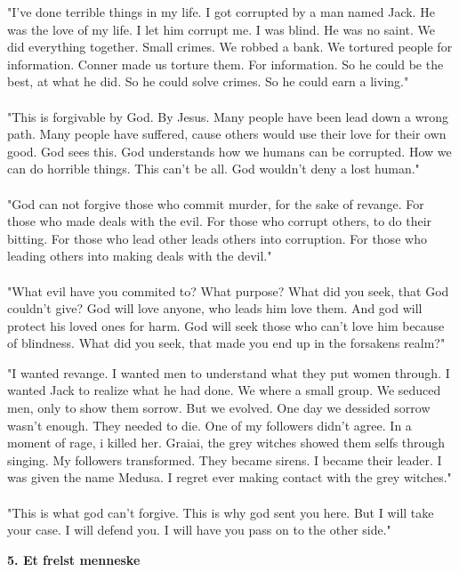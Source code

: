 \documentclass[]{article}
\begin{document}
"I've done terrible things in my life. I got corrupted by a man named Jack. He was the love of my life. I let him corrupt me. I was blind. He was no saint. We did everything together. Small crimes. We robbed a bank. We tortured people for information. Conner made us torture them. For information. So he could be the best, at what he did. So he could solve crimes. So he could earn a living."
\\ \\
"This is forgivable by God. By Jesus. Many people have been lead down a wrong path. Many people have suffered, cause others would use their love for their own good. God sees this. God understands how we humans can be corrupted. How we can do horrible things. This can't be all. God wouldn't deny a lost human."
\\ \\
"God can not forgive those who commit murder, for the sake of revange. For those who made deals with the evil. For those who corrupt others, to do their bitting. For those who lead other leads others into corruption. For those who leading others into making deals with the devil."
\\ \\
"What evil have you commited to? What purpose? What did you seek, that God couldn't give? God will love anyone, who leads him love them. And god will protect his loved ones for harm. God will seek those who can't love him because of blindness. What did you seek, that made you end up in the forsakens realm?"

"I wanted revange. I wanted men to understand what they put women through. I wanted Jack to realize what he had done. We where a small group. We seduced men, only to show them sorrow. But we evolved. One day we dessided sorrow wasn't enough. They needed to die. One of my followers didn't agree. In a moment of rage, i killed her. Graiai, the grey witches showed them selfs through singing. My followers transformed. They became sirens. I became their leader. I was given the name Medusa. I regret ever making contact with the grey witches."
\\ \\
"This is what god can't forgive. This is why god sent you here. But I will take your case. I will defend you. I will have you pass on to the other side."

\begin{center}
	\large\textbf{5. Et frelst menneske}
\end{center}
\end{document}

